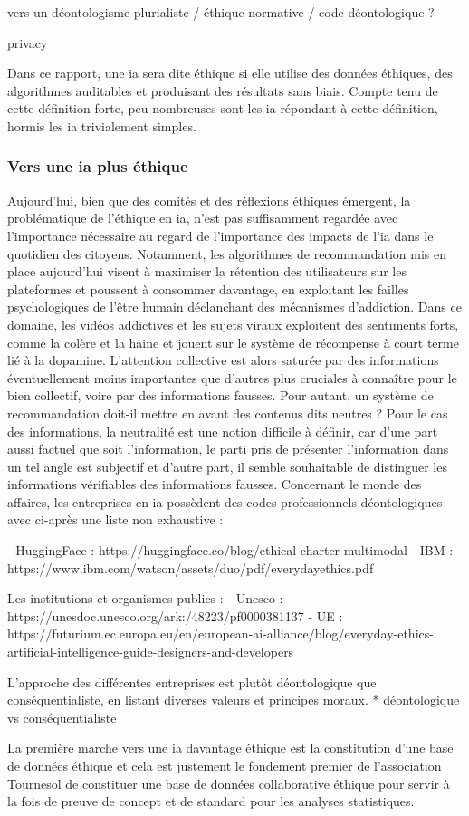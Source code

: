 vers un déontologisme plurialiste / éthique normative / code déontologique ?

privacy

Dans ce rapport, une \gls{ia} sera dite éthique si elle utilise des données éthiques, des algorithmes auditables et produisant des résultats sans biais. Compte tenu de cette définition forte, peu nombreuses sont les \gls{ia} répondant à cette définition, hormis les \gls{ia} trivialement simples.


\subsubsection{Vers une \gls{ia} plus éthique}

Aujourd'hui, bien que des comités et des réflexions éthiques émergent, la problématique de l'éthique en \gls{ia}, n'est pas suffisamment regardée avec l'importance nécessaire au regard de l'importance des impacts de l'\gls{ia} dans le quotidien des citoyens.
Notamment, les algorithmes de recommandation mis en place aujourd'hui visent à maximiser la rétention des utilisateurs sur les plateformes et poussent à consommer davantage, en exploitant les failles psychologiques de l'être humain déclanchant des mécanismes d'addiction. Dans ce domaine, les vidéos addictives et les sujets viraux exploitent des sentiments forts, comme la colère et la haine et jouent sur le système de récompense à court terme lié à la dopamine. L'attention collective est alors saturée par des informations éventuellement moins importantes que d'autres plus cruciales à connaître pour le bien collectif, voire par des informations fausses.
Pour autant, un système de recommandation doit-il mettre en avant des contenus dits neutres ? Pour le cas des informations, la neutralité est une notion difficile à définir, car d'une part aussi factuel que soit l'information, le parti pris de présenter l'information dans un tel angle est subjectif et d'autre part, il semble souhaitable de distinguer les informations vérifiables des informations fausses.
Concernant le monde des affaires, les entreprises en \gls{ia} possèdent des codes professionnels déontologiques avec ci-après une liste non exhaustive  : 

- HuggingFace : https://huggingface.co/blog/ethical-charter-multimodal
- IBM : https://www.ibm.com/watson/assets/duo/pdf/everydayethics.pdf

Les institutions et organismes publics  : 
- Unesco : https://unesdoc.unesco.org/ark:/48223/pf0000381137
- UE : https://futurium.ec.europa.eu/en/european-ai-alliance/blog/everyday-ethics-artificial-intelligence-guide-designers-and-developers


L'approche des différentes entreprises est plutôt déontologique que conséquentialiste, en listant diverses valeurs et principes moraux.
* déontologique vs conséquentialiste

La première marche vers une \gls{ia} davantage éthique est la constitution d'une base de données éthique et cela est justement le fondement premier de l'association Tournesol de constituer une base de données collaborative éthique pour servir à la fois de preuve de concept et de standard pour les analyses statistiques.